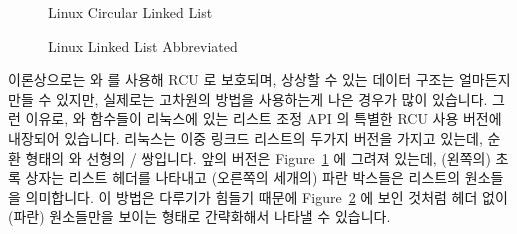 \begin{figure}[tb]
\begin{center}
\end{center}
\caption{Linux Circular Linked List}
\label{fig:defer:Linux Circular Linked List}
\end{figure}

\begin{figure}[tb]
\centering
{}
\caption{Linux Linked List Abbreviated}
\label{fig:defer:Linux Linked List Abbreviated}
\end{figure}

이론상으로는  와  를 사용해 RCU
로 보호되며, 상상할 수 있는 데이터 구조는 얼마든지 만들 수 있지만, 실제로는
고차원의 방법을 사용하는게 나은 경우가 많이 있습니다.
그런 이유로,  와  함수들이
리눅스에 있는 리스트 조정 API 의 특별한 RCU 사용 버전에 내장되어 있습니다.
리눅스는 이중 링크드 리스트의 두가지 버전을 가지고 있는데, 순환 형태의
 와 선형의 /
쌍입니다.
앞의 버전은
Figure~\ref{fig:defer:Linux Circular Linked List} 에 그려져 있는데, (왼쪽의)
초록 상자는 리스트 헤더를 나타내고 (오른쪽의 세개의) 파란 박스들은 리스트의
원소들을 의미합니다.
이 방법은 다루기가 힘들기 때문에
Figure~\ref{fig:defer:Linux Linked List Abbreviated} 에 보인 것처럼 헤더 없이
(파란) 원소들만을 보이는 형태로 간략화해서 나타낼 수 있습니다.

